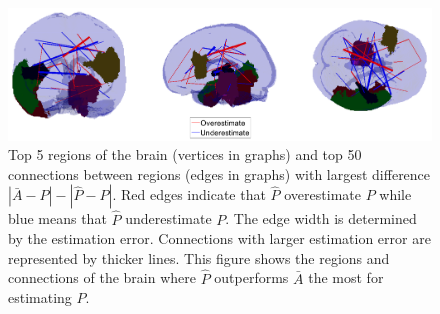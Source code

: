 \documentclass[10pt,letterpaper]{article}
\begin{document}
\begin{figure}[!htb]
\centering
\includegraphics[width=1\textwidth]{Diff_between_desikan.png}
\caption{Top 5 regions of the brain (vertices in graphs) and top 50 connections between regions (edges in graphs) with largest difference $|\bar{A} - P| - |\hat{P} - P|$. Red edges indicate that $\hat{P}$ overestimate $P$ while blue means that $\hat{P}$ underestimate $P$. The edge width is determined by the estimation error. Connections with larger estimation error are represented by thicker lines. This figure shows the regions and connections of the brain where $\hat{P}$ outperforms $\bar{A}$ the most for estimating $P$.}
\label{fig:Diff_between_desikan}
\end{figure}
\end{document}
